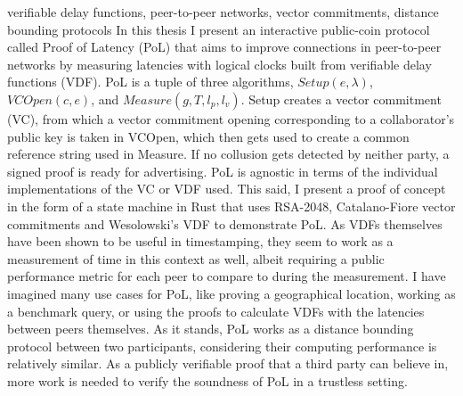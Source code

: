 \begin{itabstract}{verifiable delay functions, peer-to-peer networks, vector commitments, distance bounding protocols}
	In this thesis I present an interactive public-coin protocol called Proof of Latency (PoL) that aims to improve connections in peer-to-peer networks by measuring latencies with logical clocks built from verifiable delay functions (VDF). PoL is a tuple of three algorithms, \(Setup(e, \lambda)\), \(VCOpen(c, e)\), and \(Measure(g, T, l_p, l_v)\). Setup creates a vector commitment (VC), from which a vector commitment opening corresponding to a collaborator's public key is taken in VCOpen, which then gets used to create a common reference string used in Measure. If no collusion gets detected by neither party, a signed proof is ready for advertising.
	PoL is agnostic in terms of the individual implementations of the VC or VDF used. This said, I present a proof of concept in the form of a state machine in Rust that uses RSA-2048, Catalano-Fiore vector commitments and Wesolowski's VDF to demonstrate PoL.
	As VDFs themselves have been shown to be useful in timestamping, they seem to work as a measurement of time in this context as well, albeit requiring a public performance metric for each peer to compare to during the measurement. I have imagined many use cases for PoL, like proving a geographical location, working as a benchmark query, or using the proofs to calculate VDFs with the latencies between peers themselves.
	As it stands, PoL works as a distance bounding protocol between two participants, considering their computing performance is relatively similar. As a publicly verifiable proof that a third party can believe in, more work is needed to verify the soundness of PoL in a trustless setting.
\end{itabstract}
